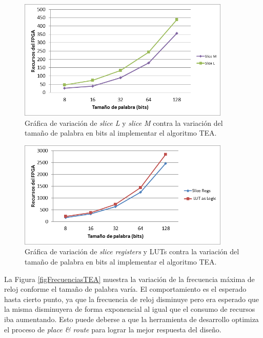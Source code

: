 \begin{figure}[H]
	\centering
	\includegraphics[width=0.9\textwidth]{./images/figSlicesTEA}
	\caption{Gráfica de variación de \textit{slice L} y \textit{slice M} contra la variación del tamaño de palabra en bits al implementar el algoritmo TEA.}
	\label{figSlicesTEA}
\end{figure}
\begin{figure}[H]
	\centering
	\includegraphics[width=0.9\textwidth]{./images/figSliceRegsLutsTEA}
	\caption{Gráfica de variación de \textit{slice registers} y LUTs contra la variación del tamaño de palabra en bits al implementar el algoritmo TEA.}
	\label{figSliceRegsLutsTEA}
\end{figure}

La Figura \ref{figFrecuenciasTEA} muestra la variación de la frecuencia máxima de reloj conforme el tamaño de palabra varía. El comportamiento es el esperado hasta cierto punto, ya que la frecuencia de reloj disminuye pero era esperado que la misma disminuyera de forma exponencial al igual que el consumo de recursos iba aumentando. Esto puede deberse a que la herramienta de desarrollo optimiza el proceso de \textit{place \& route} para lograr la mejor respuesta del diseño.

